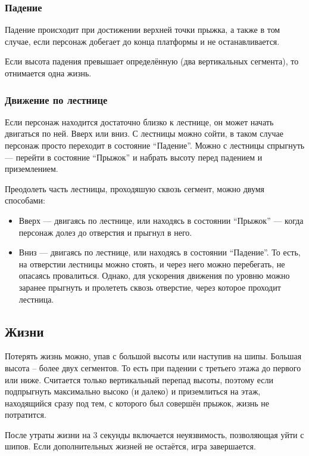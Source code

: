 \documentclass[12pt,a4paper]{article}
\begin{document}
\subsubsection{Падение}
Падение происходит при достижении верхней точки прыжка, а также в том случае, если персонаж добегает до конца платформы и не останавливается.

Если высота падения превышает определённую (два вертикальных сегмента), то отнимается одна жизнь.\\

\subsubsection{Движение по лестнице}
Если персонаж находится достаточно близко к лестнице, он может начать двигаться по ней. Вверх или вниз. С лестницы можно сойти, в таком случае персонаж просто переходит в состояние ``Падение''. Можно с лестницы спрыгнуть --- перейти в состояние ``Прыжок'' и набрать высоту перед падением и приземлением.

Преодолеть часть лестницы, проходяшую сквозь сегмент, можно двумя способами:
\begin{itemize}
\item Вверх --- двигаясь по лестнице, или находясь в состоянии ``Прыжок'' --- когда персонаж долез до отверстия и прыгнул в него.
\item Вниз --- двигаясь по лестнице, или находясь в состоянии ``Падение''. То есть, на отверстии лестницы можно стоять, и через него можно перебегать, не опасаясь провалиться. Однако, для ускорения движения по уровню можно заранее прыгнуть и пролететь сквозь отверстие, через которое проходит лестница.\\
\end{itemize}

\subsection{Жизни}
Потерять жизнь можно, упав с большой высоты или наступив на шипы. Большая высота -- более двух сегментов. То есть при падении с третьего этажа до первого или ниже. Считается только вертикальный перепад высоты, поэтому если подпрыгнуть максимально высоко (и далеко) и приземлиться на этаж, находящийся сразу под тем, с которого был совершён прыжок, жизнь не потратится.

После утраты жизни на 3 секунды включается неуязвимость, позволяющая уйти с шипов. Если дополнительных жизней не остаётся, игра завершается.\\
\end{document}
